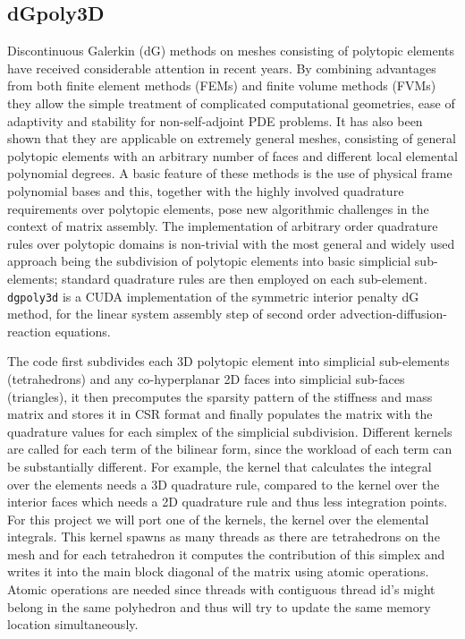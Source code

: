 
\subsection{dGpoly3D}\label{sec:dgpoly3d}

Discontinuous Galerkin (dG) methods on meshes consisting of polytopic elements have received considerable attention in recent years.
By combining advantages from both finite element methods (FEMs) and finite volume methods (FVMs) they allow the simple treatment of complicated computational geometries, ease of adaptivity and stability for non-self-adjoint PDE problems.
It has also been shown that they are applicable on extremely general meshes, consisting of general polytopic elements with an arbitrary number of faces and different local elemental polynomial degrees.
A basic feature of these methods is the use of physical frame polynomial bases and this, together with the highly involved quadrature requirements over polytopic elements, pose new algorithmic challenges in the context of matrix assembly.
The implementation of arbitrary order quadrature rules over polytopic domains is non-trivial with the most general and widely used approach being the subdivision of polytopic elements into basic simplicial sub-elements; standard quadrature rules are then employed on each sub-element.
\texttt{dgpoly3d} \cite{dong_gpu-accelerated_2021} is a CUDA implementation of the symmetric interior penalty dG method, for the linear system assembly step of second order advection-diffusion-reaction equations.

The code first subdivides each 3D polytopic element into simplicial sub-elements (tetrahedrons) and any co-hyperplanar 2D faces into simplicial sub-faces (triangles), it then precomputes the sparsity pattern of the stiffness and mass matrix and stores it in CSR format and finally populates the matrix with the quadrature values for each simplex of the simplicial subdivision.
Different kernels are called for each term of the bilinear form, since the workload of each term can be substantially different.
For example, the kernel that calculates the integral over the elements needs a 3D quadrature rule, compared to the kernel over the interior faces which needs a 2D quadrature rule and thus less integration points.
For this project we will port one of the kernels, the kernel over the elemental integrals.
This kernel spawns as many threads as there are tetrahedrons on the mesh and for each tetrahedron it computes the contribution of this simplex and writes it into the main block diagonal of the matrix using atomic operations.
Atomic operations are needed since threads with contiguous thread id's might belong in the same polyhedron and thus will try to update the same memory location simultaneously.

